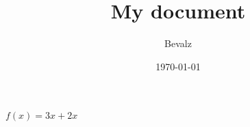 \documentclass[11pt,twoside,a4paper,twocolumn]{book}%
\title{My document}
\author{Bevalz}
\date{\today}
\begin{document}
\maketitle

$f(x)=3x+2x$
\end{document}
